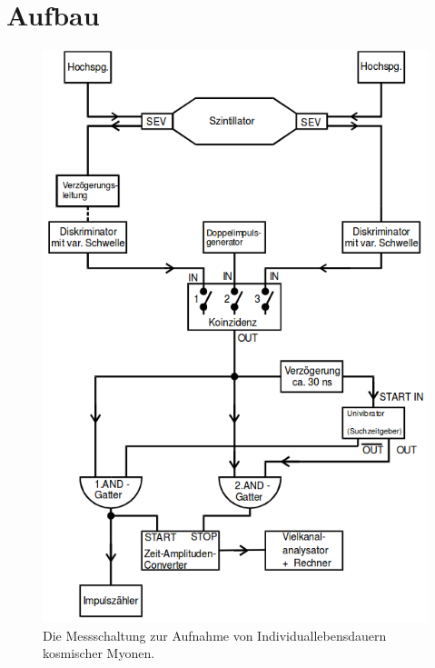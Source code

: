 \section{Aufbau}
\label{sec:Aufbau}
\begin{figure}
    \centering
    \includegraphics[width=\textwidth]{content/images/AufbauV01.png}
    \caption{Die Messschaltung zur Aufnahme von Individuallebensdauern kosmischer Myonen.}
    \label{fig:Aufbau}
    \end{figure}
